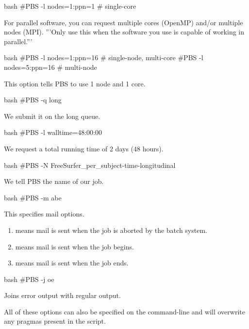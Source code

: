 \begin{code}{bash}
  #PBS -l nodes=1:ppn=1   # single-core
\end{code}

For parallel software, you can request multiple cores (OpenMP) and/or multiple
nodes (MPI). '''Only use this when the software you use is capable of working in
parallel.'''

\begin{code}{bash}
  #PBS -l nodes=1:ppn=16  # single-node, multi-core
  #PBS -l nodes=5:ppn=16  # multi-node
\end{code}

This option tells PBS to use 1 node and 1 core.

\begin{code}{bash}
  #PBS -q long
\end{code}

We submit it on the long queue.

\begin{code}{bash}
  #PBS -l walltime=48:00:00
\end{code}

We request a total running time of 2 days (48 hours).

\begin{code}{bash}
  #PBS -N FreeSurfer_per_subject-time-longitudinal
\end{code}

We tell PBS the name of our job.

\begin{code}{bash}
  #PBS -m abe
\end{code}

This specifies mail options. 
\begin{enumerate}
\item {} means mail is sent when the job is aborted by the batch system.
\item {} means mail is sent when the job begins.
\item {} means mail is sent when the job ends.
\end{enumerate}

\begin{code}{bash}
  #PBS -j oe
\end{code}

Joins error output with regular output.

All of these options can also be specified on the command-line and will
overwrite any pragmas present in the script.
